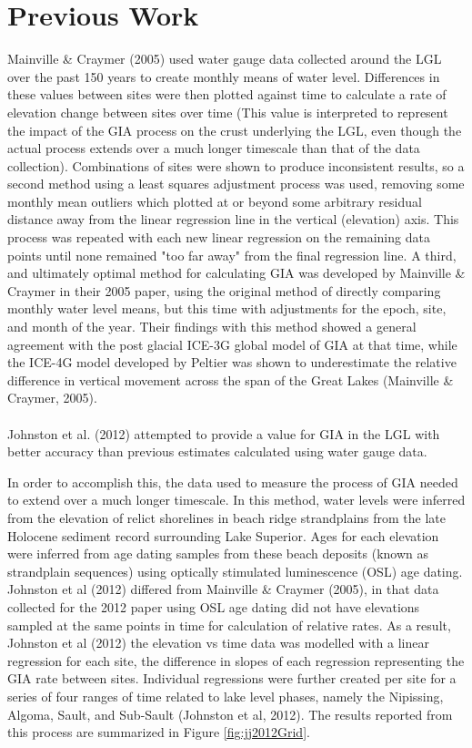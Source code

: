 \section{Previous Work} 
Mainville \& Craymer (2005) used water gauge data collected around the LGL over the past 150 years to
 create monthly means of water level. Differences in these values between sites
 were then plotted against time to calculate a rate of elevation change between
 sites over time (This value is interpreted to represent the impact of the GIA
 process on the crust underlying the LGL, even though the actual process extends
 over a much longer timescale than that of the data collection). Combinations of sites were shown to produce
 inconsistent results, so a second method using a least squares adjustment process was used,
 removing some monthly mean outliers which plotted at or beyond some arbitrary residual distance away 
 from the linear regression line in the vertical (elevation) axis. 
 This process was repeated with each new linear regression on the remaining data
 points until none remained "too far away" from
 the final regression line. A third, and ultimately optimal method for calculating
 GIA was developed by
 Mainville \& Craymer in their 2005 paper, using the original
 method of directly comparing monthly
 water level means, but this time with adjustments for the epoch, site, and month of the year.
 Their findings with this method showed a general agreement with the post glacial
 ICE-3G global model of GIA at that time, while the ICE-4G model developed by Peltier
 was shown to underestimate the relative difference in vertical movement across
 the span of the Great Lakes (Mainville \& Craymer, 2005).\\ \\
Johnston et al. (2012) attempted to provide a value for GIA in the LGL with
 better accuracy than previous estimates calculated using water
 gauge data.
 
In order to accomplish this, the data used to measure the process of
 GIA needed to extend over a much longer timescale. In this method, water
 levels were inferred from the elevation of relict shorelines in beach ridge
 strandplains from the late Holocene sediment record surrounding Lake Superior.
 Ages for each elevation were inferred from age dating samples from these beach
 deposits (known as strandplain sequences) using
 optically stimulated luminescence (OSL) age dating. Johnston et al (2012) differed from
 Mainville \& Craymer (2005), in that data collected for the 2012 paper using OSL
 age dating did not have
 elevations sampled at the same points in time for calculation of relative
 rates. As a result, Johnston et al (2012) the elevation vs time data was modelled with a linear
 regression for each site, the difference in slopes of each regression representing the GIA rate
 between sites. Individual regressions were further created per site
 for a series of four ranges of time related to lake level phases, namely the Nipissing,
 Algoma, Sault, and Sub-Sault (Johnston et al, 2012). The results reported from this process
 are summarized in Figure \ref{fig:jj2012Grid}. \\
 
